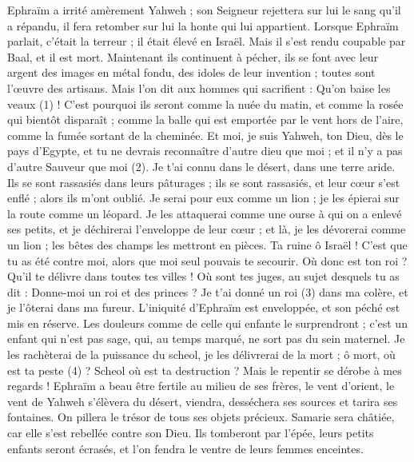 \begin{multicols}{2}
Ephraïm a irrité amèrement Yahweh ; son Seigneur rejettera sur lui le sang qu’il a répandu, il fera retomber sur lui la honte qui lui appartient.
\VerseOne{}Lorsque Ephraïm parlait, c’était la terreur ; il était élevé en Israël. Mais il s'est rendu coupable par Baal, et il est mort.
Maintenant ils continuent à pécher, ils se font avec leur argent des images en métal fondu, des idoles de leur invention ; toutes sont l’œuvre des artisans. Mais l’on dit aux hommes qui sacrifient : Qu’on baise les veaux (1) !
C'est pourquoi ils seront comme la nuée du matin, et comme la rosée qui bientôt disparaît ; comme la balle qui est emportée par le vent hors de l’aire, comme la fumée sortant de la cheminée.
Et moi, je suis Yahweh, ton Dieu, dès le pays d’Egypte, et tu ne devrais reconnaître d'autre dieu que moi ; et il n'y a pas d’autre Sauveur que moi (2).
Je t'ai connu dans le désert, dans une terre aride.
Ils se sont rassasiés dans leurs pâturages ; ils se sont rassasiés, et leur cœur s'est enflé ; alors ils m'ont oublié.
Je serai pour eux comme un lion ; je les épierai sur la route comme un léopard.
Je les attaquerai comme une ourse à qui on a enlevé ses petits, et je déchirerai l’enveloppe de leur cœur ; et là, je les dévorerai comme un lion ; les bêtes des champs les mettront en pièces.
Ta ruine ô Israël ! C’est que tu as été contre moi, alors que moi seul pouvais te secourir.
Où donc est ton roi ? Qu'il te délivre dans toutes tes villes ! Où sont tes juges, au sujet desquels tu as dit : Donne-moi un roi et des princes ?
Je t'ai donné un roi (3) dans ma colère, et je l'ôterai dans ma fureur.
L'iniquité d'Ephraïm est enveloppée, et son péché est mis en réserve.
Les douleurs comme de celle qui enfante le surprendront ; c'est un enfant qui n'est pas sage, qui, au temps marqué, ne sort pas du sein maternel.
Je les rachèterai de la puissance du scheol, je les délivrerai de la mort ; ô mort, où est ta peste (4) ? Scheol où est ta destruction ? Mais le repentir se dérobe à mes regards !
Ephraïm a beau être fertile au milieu de ses frères, le vent d’orient, le vent de Yahweh s’élèvera du désert, viendra, desséchera ses sources et tarira ses fontaines. On pillera le trésor de tous ses objets précieux.
Samarie sera châtiée, car elle s'est rebellée contre son Dieu. Ils tomberont par l'épée, leurs petits enfants seront écrasés, et l’on fendra le ventre de leurs femmes enceintes.

\end{multicols}
